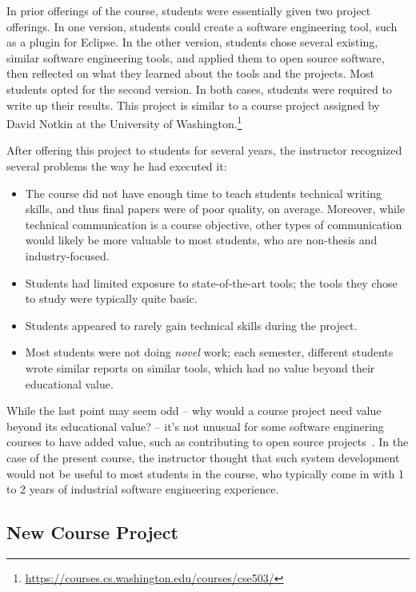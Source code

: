\documentclass{sig-alternate-05-2015}
\begin{document}

In prior offerings of the course,
students were essentially given two project offerings.
In one version, students could create
a software engineering tool, such as a plugin for Eclipse.
In the other version, students chose several existing,
similar software engineering tools, and applied them
to open source software, then reflected 
on what they learned about the tools and the 
projects.
Most students opted for the second version.
In both cases, students were required to write up their results.
This project is similar to a course project
assigned by David Notkin at the 
University of Washington.\footnote{\url{https://courses.cs.washington.edu/courses/cse503/}}

After offering this project to students for 
several years, the instructor recognized several
problems the way he had executed it:

\begin{itemize}  
  \item The course did not have enough time to teach students
  		technical writing skills, and thus final papers were 
  		of poor quality, on average. Moreover, while technical
  		communication is a course objective, other types of
  		communication would likely be more valuable to most
  		students, who are non-thesis and industry-focused.   		 
  \item Students had limited exposure to state-of-the-art
  		tools; the tools they chose to study were typically
  		quite basic.
  \item Students appeared to rarely gain technical skills 
  		during the project.  
  \item Most students were not doing \emph{novel} work; each semester,
  		different students wrote similar reports on similar tools,
  		which had no value beyond their educational value. 
\end{itemize}

While the last point may seem odd -- why would a course project need
value beyond its educational value? -- it's not unusual for 
some software enginering courses to have added value,
such as contributing to open source projects~\cite{pedroni2007open,meneely2008rose}.
In the case of the present course, the instructor thought 
that such system development would not be useful to most students
in the course, who typically come in with 1 to 2 years of 
industrial software engineering experience. 

\subsection{New Course Project}
\end{document}
